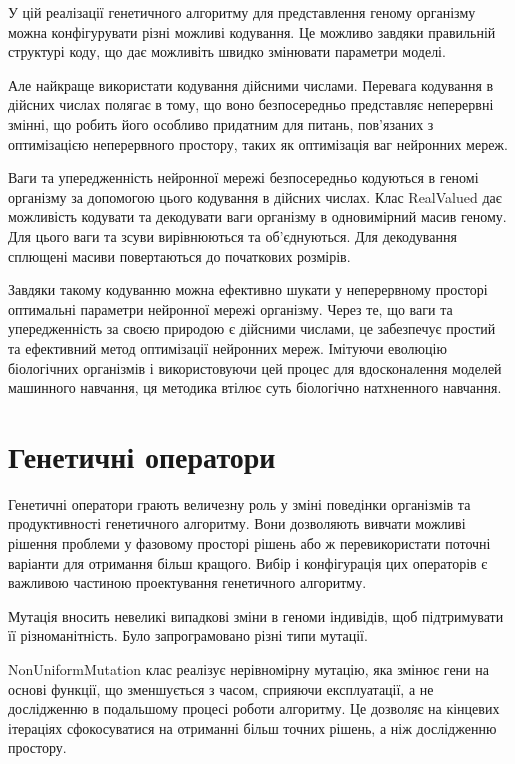 У цій реалізації генетичного алгоритму для представлення геному організму можна конфігурувати різні можливі кодування. Це можливо завдяки правильній структурі коду, що дає можливіть швидко змінювати параметри моделі.

Але найкраще використати кодування дійсними числами. Перевага кодування в дійсних числах полягає в тому, що воно безпосередньо представляє неперервні змінні, що робить його особливо придатним для питань, пов'язаних з оптимізацією неперервного простору, таких як оптимізація ваг нейронних мереж.

Ваги та упередженність нейронної мережі безпосередньо кодуються в геномі організму за допомогою цього кодування в дійсних числах. Клас RealValued дає можливість кодувати та декодувати ваги організму в одновимірний масив геному. Для цього ваги та зсуви вирівнюються та об'єднуються. Для декодування сплющені масиви повертаються до початкових розмірів.

Завдяки такому кодуванню можна ефективно шукати у неперервному просторі оптимальні параметри нейронної мережі організму. Через те, що ваги та упередженність за своєю природою є дійсними числами, це забезпечує простий та ефективний метод оптимізації нейронних мереж. Імітуючи еволюцію біологічних організмів і використовуючи цей процес для вдосконалення моделей машинного навчання, ця методика втілює суть біологічно натхненного навчання.

\section{Генетичні оператори}

Генетичні оператори грають величезну роль у зміні поведінки організмів та продуктивності генетичного алгоритму. Вони дозволяють вивчати можливі рішення проблеми у фазовому просторі рішень або ж перевикористати поточні варіанти для отримання більш кращого. Вибір і конфігурація цих операторів є важливою частиною проектування генетичного алгоритму.

Мутація вносить невеликі випадкові зміни в геноми індивідів, щоб підтримувати її різноманітність. Було запрограмовано різні типи мутації.

NonUniformMutation клас реалізує нерівномірну мутацію, яка змінює гени на основі функції, що зменшується з часом, сприяючи експлуатації, а не дослідженню в подальшому процесі роботи алгоритму. Це дозволяє на кінцевих ітераціях сфокосуватися на отриманні більш точних рішень, а ніж дослідженню простору.


